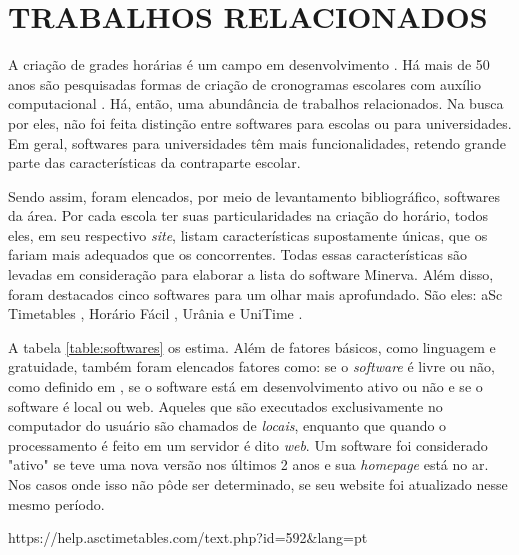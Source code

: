 \documentclass[12pt,a4paper]{article}
\begin{document}
	\newpage

	\section{TRABALHOS RELACIONADOS}

		\par A criação de grades horárias é um campo em desenvolvimento \cite{patat2020}. Há mais de 50 anos são pesquisadas formas de criação de cronogramas escolares com auxílio computacional \cite{appleby}. Há, então, uma abundância de trabalhos relacionados. Na busca por eles, não foi feita distinção entre softwares para escolas ou para universidades. Em geral, softwares para universidades têm mais funcionalidades, retendo grande parte das características da contraparte escolar.

		\par Sendo assim, foram elencados, por meio de levantamento bibliográfico, softwares da área. Por cada escola ter suas particularidades na criação do horário, todos eles, em seu respectivo \textit{site}, listam características supostamente únicas, que os fariam mais adequados que os concorrentes. Todas essas características são levadas em consideração para elaborar a lista do software Minerva. Além disso, foram destacados cinco softwares para um olhar mais aprofundado. São eles: aSc Timetables \cite{rel_asctimetables}, Horário Fácil \cite{rel_horariofacil}, Urânia \cite{rel_urania} e UniTime \cite{rel_unitime}.

		\par A tabela \ref{table:softwares} os estima. Além de fatores básicos, como linguagem e gratuidade, também foram elencados fatores como: se o \textit{software} é livre ou não, como definido em \cite{publico}, se o software está em desenvolvimento ativo ou não e se o software é local ou web. Aqueles que são executados exclusivamente no computador do usuário são chamados de \textit{locais}, enquanto que quando o processamento é feito em um servidor é dito \textit{web}.  Um software foi considerado "ativo" se teve uma nova versão nos últimos 2 anos e sua \textit{homepage} está no ar. Nos casos onde isso não pôde ser determinado, se seu website foi atualizado nesse mesmo período.

		https://help.asctimetables.com/text.php?id=592\&lang=pt

\end{document}
